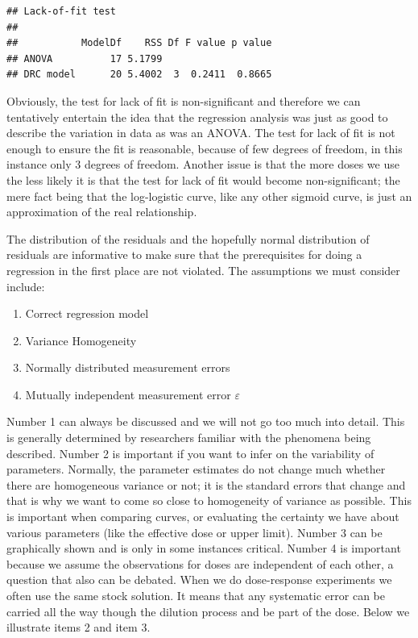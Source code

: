 \documentclass[letterpaper,]{book}
\providecommand{\tightlist}{%
  \setlength{\itemsep}{0pt}\setlength{\parskip}{0pt}}
\begin{document}
\begin{verbatim}
## Lack-of-fit test
## 
##           ModelDf    RSS Df F value p value
## ANOVA          17 5.1799                   
## DRC model      20 5.4002  3  0.2411  0.8665
\end{verbatim}

Obviously, the test for lack of fit is non-significant and therefore we can tentatively entertain the idea that the regression analysis was just as good to describe the variation in data as was an ANOVA. The test for lack of fit is not enough to ensure the fit is reasonable, because of few degrees of freedom, in this instance only 3 degrees of freedom. Another issue is that the more doses we use the less likely it is that the test for lack of fit would become non-significant; the mere fact being that the log-logistic curve, like any other sigmoid curve, is just an approximation of the real relationship.

The distribution of the residuals and the hopefully normal distribution of residuals are informative to make sure that the prerequisites for doing a regression in the first place are not violated. The assumptions we must consider include:

\begin{enumerate}
\def\labelenumi{\arabic{enumi}.}
\tightlist
\item
  Correct regression model
\item
  Variance Homogeneity
\item
  Normally distributed measurement errors
\item
  Mutually independent measurement error \(\varepsilon\)
\end{enumerate}

Number 1 can always be discussed and we will not go too much into detail. This is generally determined by researchers familiar with the phenomena being described. Number 2 is important if you want to infer on the variability of parameters. Normally, the parameter estimates do not change much whether there are homogeneous variance or not; it is the standard errors that change and that is why we want to come so close to homogeneity of variance as possible. This is important when comparing curves, or evaluating the certainty we have about various parameters (like the effective dose or upper limit). Number 3 can be graphically shown and is only in some instances critical. Number 4 is important because we assume the observations for doses are independent of each other, a question that also can be debated. When we do dose-response experiments we often use the same stock solution. It means that any systematic error can be carried all the way though the dilution process and be part of the dose. Below we illustrate items 2 and item 3.
\end{document}
